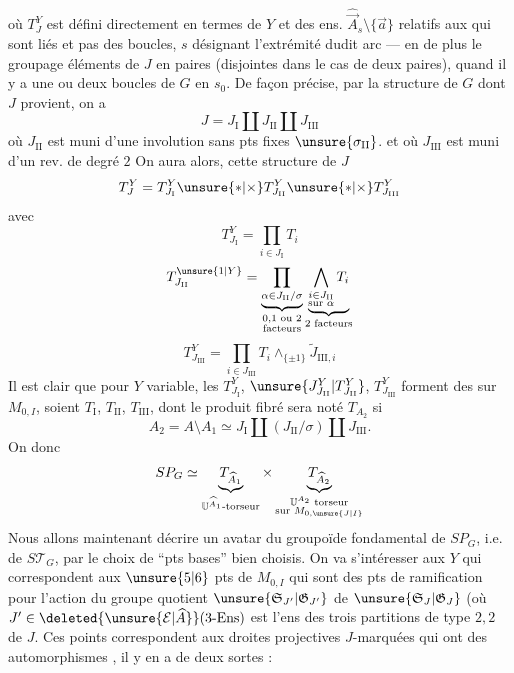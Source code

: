 où $T_J^Y$ est  défini directement en termes de $Y$ et des ens.  $\widehat{\vec A}_s\setminus\{\vec a\}$ relatifs aux   qui sont liés et pas des boucles, $s$ désignant l'extrémité  dudit arc --- en  de plus  le groupage  éléments de $J$ en  paires (disjointes dans le cas de deux paires), quand il y a une ou deux boucles de $G$ en $s_0$. De façon précise, par la structure de $G$ dont $J$ provient, on a
\[
J=J_{\mathrm{I}}\amalg J_{\mathrm{II}}\amalg J_{\mathrm{III}}
\]
où $J_{\mathrm{II}}$ est muni d'une involution sans pts fixes $\unsure{\sigma_{\mathrm{II}}}$.
et où $J_{\mathrm{III}}$ est muni d'un rev. de degré $2$
On aura alors,  cette structure de $J$
\[
T_J^Y=T_{J_{\mathrm{I}}}^Y\unsure{*|\times}T_{J_{\mathrm{II}}}^Y\unsure{*|\times}T_{J_{\mathrm{III}}}^Y
\]
avec
\[
T_{J_{\mathrm{I}}}^Y=\prod_{i\in J_{\mathrm{I}}}T_i
\]
\[
T_{J_{\mathrm{II}}}^{\unsure{1|Y}}=
\underbrace{\prod_{\alpha\in J_{\mathrm{II}}/\sigma}}_{\substack{0,1\text{ ou }2\\\text{facteurs}}}
\underbrace{\bigwedge_{\substack{i\in J_{\mathrm{II}}\\\text{sur }\alpha}}T_i}_{2\text{ facteurs}}
\]
\[
T_{J_{\mathrm{III}}}^Y=\prod_{i\in J_{\mathrm{III}}}T_i\wedge_{\{\pm1\}}\widetilde{J}_{\mathrm{III},i}
\]
Il est clair que pour $Y$ variable, les $T_{J_{\mathrm{I}}}^Y$, $\unsure{J_{J_{\mathrm{II}}}^Y|T_{J_{\mathrm{II}}}^Y}$, $T_{J_{\mathrm{III}}}^Y$ forment des   sur $M_{0,I}$, soient $T_{\mathrm{I}}$, $T_{\mathrm{II}}$, $T_{\mathrm{III}}$, dont le produit fibré sera noté $T_{A_2}$ si
\[
A_2=A\setminus A_1\simeq J_{\mathrm{I}}\amalg(J_{\mathrm{II}}/\sigma)\amalg J_{\mathrm{III}}.
\]
On  donc
\[
SP_G\simeq
\underbrace{T_{\widehat{A}_1}}_{\mathbb{U}^{\widehat{A}_1}\text{-torseur}}
\times
\underbrace{T_{\widehat{A}_2}}_{\substack{\mathbb{U}^{A_2}\text{ torseur}\\\text{sur }M_{0,\unsure{J|I}}}}
\]
Nous allons maintenant décrire un avatar du groupoïde fondamental de $SP_G$, i.e. de $S\mathcal{T}_G$, par le choix de ``pts bases'' bien choisis. On va s'intéresser aux $Y$ qui correspondent aux $\unsure{5|6}$ pts de $M_{0,I}$ qui sont des pts de ramification pour l'action du groupe quotient $\unsure{\mathfrak{S}_{J'}|\mathfrak{G}_{J'}}$ de $\unsure{\mathfrak{S}_J|\mathfrak{G}_J}$ (où $J'\in\deleted{\unsure{\mathcal{E}|\widehat{A}}}(3\text{-Ens})$ est l'ens des trois partitions de
type $2,2$ de $J$. Ces points correspondent aux droites projectives $J$-marquées qui ont des automorphismes  , il y en a de deux sortes :

